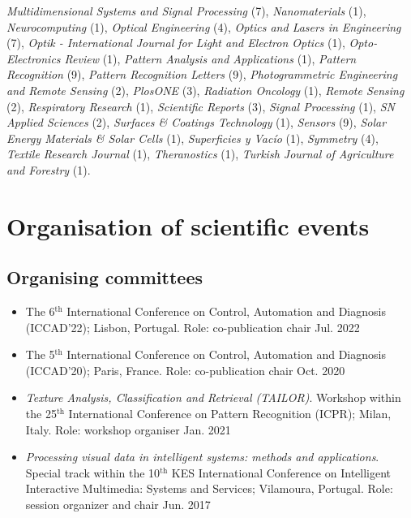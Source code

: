 \documentclass[11pt]{article}
\begin{document}
\begin{itemize}
    \emph{Multidimensional Systems and Signal Processing} (7),
    \emph{Nanomaterials} (1),
    \emph{Neurocomputing} (1),
    \emph{Optical Engineering} (4),
    \emph{Optics and Lasers in Engineering} (7),
    \emph{Optik - International Journal for Light and Electron Optics} (1),
    \emph{Opto-Electronics Review} (1),
    \emph{Pattern Analysis and Applications} (1),
    \emph{Pattern Recognition} (9),
    \emph{Pattern Recognition Letters} (9),
    \emph{Photogrammetric Engineering and Remote Sensing} (2),
    \emph{PlosONE} (3),
    \emph{Radiation Oncology} (1),
    \emph{Remote Sensing} (2),
    \emph{Respiratory Research} (1),
    \emph{Scientific Reports} (3),
    \emph{Signal Processing} (1),
    \emph{SN Applied Sciences} (2),
    \emph{Surfaces \& Coatings Technology} (1),
    \emph{Sensors} (9),
    \emph{Solar Energy Materials \& Solar Cells} (1),
    \emph{Superficies y Vacío} (1),
    \emph{Symmetry} (4),
    \emph{Textile Research Journal} (1),
    \emph{Theranostics} (1),
    \emph{Turkish Journal of Agriculture and Forestry} (1).
\end{itemize}

\section*{Organisation of scientific events}

\subsection*{Organising committees}

\begin{itemize} 

	\item The 6$^\text{th}$ International Conference on Control, Automation and Diagnosis (ICCAD'22); Lisbon, Portugal. Role: co-publication chair \hfill Jul. 2022

	\item The 5$^\text{th}$ International Conference on Control, Automation and Diagnosis (ICCAD'20); Paris, France. Role: co-publication chair \hfill Oct. 2020 

	\item \emph{Texture Analysis, Classification and Retrieval (TAILOR)}. Workshop within the 25$^\text{th}$ International Conference on Pattern Recognition (ICPR); Milan, Italy. Role: workshop organiser \hfill Jan. 2021

	\item \emph{Processing visual data in intelligent systems: methods and applications}. Special track within the 10$^\text{th}$ KES International Conference on Intelligent Interactive Multimedia: Systems and Services; Vilamoura, Portugal. Role: session organizer and chair \hfill Jun. 2017

\end{itemize}	
\end{document}

